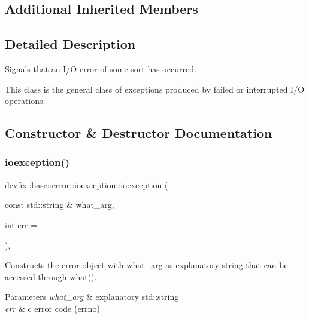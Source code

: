 \subsection*{Additional Inherited Members}


\subsection{Detailed Description}
Signals that an I/O error of some sort has occurred. 

This class is the general class of exceptions produced by failed or interrupted I/O operations. 

\subsection{Constructor \& Destructor Documentation}
\mbox{\label{structdevfix_1_1base_1_1error_1_1ioexception_ac44798aad44f6803e385ad36effed298}} 
\subsubsection{\texorpdfstring{ioexception()}{ioexception()}\hspace{0.1cm}{\footnotesize\ttfamily [1/2]}}
{\footnotesize\ttfamily devfix\+::base\+::error\+::ioexception\+::ioexception (\begin{DoxyParamCaption}\item[{const std\+::string \&}]{what\+\_\+arg,  }\item[{int}]{err = {} }\end{DoxyParamCaption})\hspace{0.3cm}{\ttfamily [inline]}, {\ttfamily [explicit]}}

Constructs the error object with what\+\_\+arg as explanatory string that can be accessed through \hyperlink{structdevfix_1_1base_1_1error_1_1baseexception_a16327152a55d65b1e537825231fbd452}{what()}. 
\begin{DoxyParams}{Parameters}
{\em what\+\_\+arg} & explanatory std\+::string \\
\hline
{\em err} & c error code (errno) \\
\hline
\end{DoxyParams}
\mbox{\label{structdevfix_1_1base_1_1error_1_1ioexception_a2f029b0f81a5a369705cf7920cadd8cd}} 
